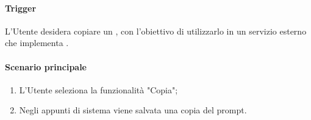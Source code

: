 \paragraph*{Trigger}
L'Utente desidera copiare un , con l'obiettivo di utilizzarlo in un servizio esterno che implementa .

\paragraph*{Scenario principale}
\begin{enumerate}
  \item L'Utente seleziona la funzionalità "Copia";
  \item Negli appunti di sistema viene salvata una copia del prompt.
\end{enumerate}